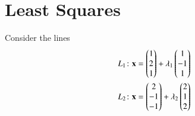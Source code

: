 \documentclass[journal,12pt,twocolumn]{IEEEtran}
\begin{document}
%


\section{Least Squares}
Consider the lines 
\begin{align}
    L_1\colon \mathbf{x}=\begin{pmatrix}1\\2\\1\end{pmatrix}+\lambda_1\begin{pmatrix}1\\-1\\1\end{pmatrix}\label{eq:pseudo:1}\\
    L_2\colon \mathbf{x}=\begin{pmatrix}2\\-1\\-1\end{pmatrix}+\lambda_2\begin{pmatrix}2\\1\\2\end{pmatrix}\label{eq:pseudo:2}
\end{align}
\end{document}
